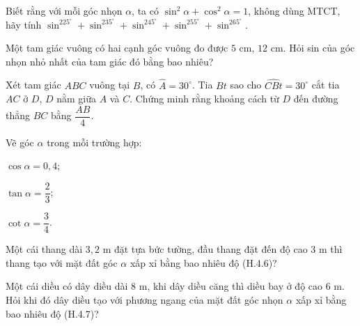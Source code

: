 \begin{practice}
\begin{questions}[series=SBT]
        \answerline
        \answerline

        \item Biết rằng với mỗi góc nhọn $\alpha$, ta có $\sin^2\alpha+\cos^2\alpha=1$, không dùng MTCT, hãy tính $\sin^225^\circ+\sin^235^\circ+\sin^245^\circ+\sin^255^\circ+\sin^265^\circ$.

        \answerline
        \answerline

        \item Một tam giác vuông có hai cạnh góc vuông đo được $5$ cm, $12$ cm. Hỏi sin của góc nhọn nhỏ nhất của tam giác đó bằng bao nhiêu?

        \answerline

        \item Xét tam giác $ABC$ vuông tại $B$, có $\widehat A=30^\circ$. Tia $Bt$ sao cho $\widehat{CBt}=30^\circ$ cắt tia $AC$ ở $D$, $D$ nằm giữa $A$ và $C$. Chứng minh rằng khoảng cách từ $D$ đến đường thẳng $BC$ bằng $\dfrac{AB}{4}$.

        \answerline
        \answerline

        \item Vẽ góc $\alpha$ trong mỗi trường hợp:
        \begin{questions}
            \item $\cos\alpha=0{,}4$;
            \item $\tan\alpha=\dfrac{2}{3}$;
            \item $\cot\alpha=\dfrac{3}{4}$.
        \end{questions}

        \answerline
        \answerline

        \item Một cái thang dài $3{,}2$ m đặt tựa bức tường, đầu thang đặt đến độ cao $3$ m thì thang tạo với mặt đất góc $\alpha$ xấp xỉ bằng bao nhiêu độ (H.4.6)?

        \answerline

        \item Một cái diều có dây diều dài $8$ m, khi dây diều căng thì diều bay ở độ cao $6$ m. Hỏi khi đó dây diều tạo với phương ngang của mặt đất góc nhọn $\alpha$ xấp xỉ bằng bao nhiêu độ (H.4.7)?

        \answerline


\end{questions}
\end{practice}
